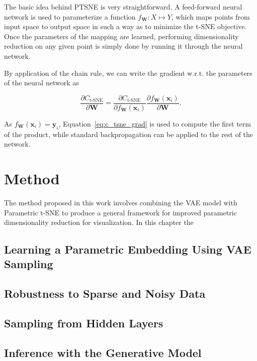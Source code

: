 The basic idea behind PTSNE is very straightforward. A feed-forward neural network is used to parameterize a function $f_\mathbf{W}: X \mapsto Y$, which maps points from input space to output space in such a way as to minimize the t-SNE objective. Once the parameters of the mapping are learned, performing dimensionality reduction on any given point is simply done by running it through the neural network.

By application of the chain rule, we can write the gradient w.r.t. the parameters of the neural network as

$$\frac{\partial C_{\text{t-SNE}}}{\partial \mathbf{W}} = \frac{\partial C_{\text{t-SNE}}}{\partial f_{\mathbf{W}}(\mathbf{x}_i)} \frac{\partial f_{\mathbf{W}}(\mathbf{x}_i)}{\partial \mathbf{W}}.$$

As $f_{\mathbf{W}}(\mathbf{x}_i) = \mathbf{y}_i$, Equation~\ref{eq:c_tsne_grad} is used to compute the first term of the product, while standard backpropagation can be applied to the rest of the network.

\newpage

\chapter{Method}
\label{ch:method}

The method proposed in this work involves combining the VAE model with Parametric t-SNE to produce a general framework for improved parametric dimensionality reduction for visualization. In this chapter the 

\section{Learning a Parametric Embedding Using VAE Sampling}

\newpage \phantom{x}
\newpage \phantom{x}
\newpage

\section{Robustness to Sparse and Noisy Data}
\label{section:robustness_to_sparse_and_noisy_data}
\newpage

\section{Sampling from Hidden Layers}
\label{section:sampling_from_hidden_layers}
\newpage

\section{Inference with the Generative Model}
\newpage

